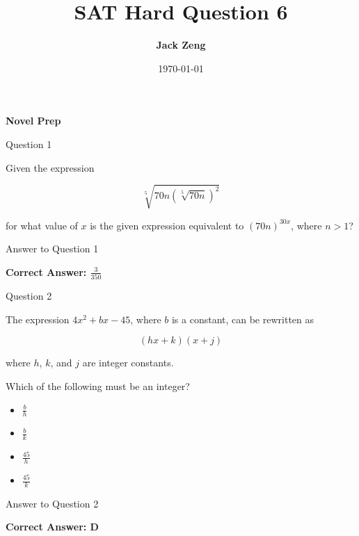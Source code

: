 \documentclass{beamer}
\title[SAT Hard Question]{\textbf{SAT Hard Question 6}}
\author{\textbf{Jack Zeng}}
\institute{\textcolor{white}{\textbf{Novel Prep}}}
\date{\today}
\begin{document}
\begin{frame}
    \titlepage
    \vfill
    \begin{flushright}
        \textcolor{purpleblue}{\Huge \textbf{Novel Prep}}
    \end{flushright}
\end{frame}


\begin{frame}{Question 1}

Given the expression

\[
\sqrt[5]{70n\left(\sqrt[5]{70n}\right)^2}
\]

for what value of $x$ is the given expression equivalent to $(70n)^{30x}$, where $n>1$?

\end{frame}

\begin{frame}{Answer to Question 1}

\textbf{Correct Answer: $\frac{3}{350}$}

\end{frame}


\begin{frame}{Question 2}

The expression $4x^2+bx-45$, where $b$ is a constant, can be rewritten as

\[
(hx+k)(x+j)
\]

where $h$, $k$, and $j$ are integer constants.

Which of the following must be an integer?

\begin{itemize}
    \item[A.] $\frac{b}{h}$
    \item[B.] $\frac{b}{k}$
    \item[C.] $\frac{45}{h}$
    \item[D.] $\frac{45}{k}$
\end{itemize}

\end{frame}

\begin{frame}{Answer to Question 2}

\textbf{Correct Answer: D}

\end{frame}
\end{document}
